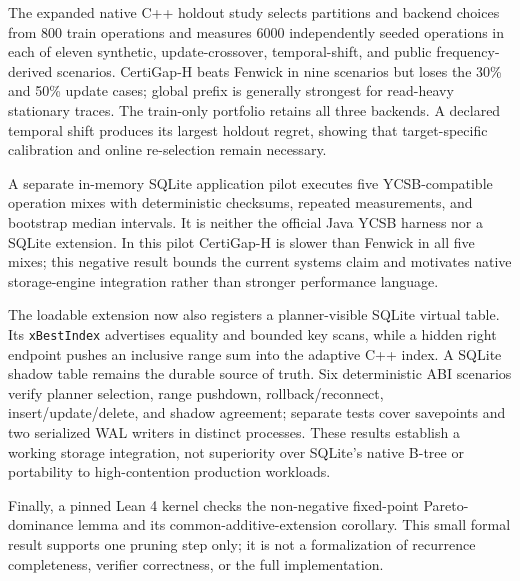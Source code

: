 \documentclass[10pt]{article}
\begin{document}
The expanded native C++ holdout study selects partitions and backend choices
from 800 train operations and measures 6000 independently seeded operations
in each of eleven synthetic, update-crossover, temporal-shift, and public
frequency-derived scenarios. CertiGap-H beats Fenwick in nine scenarios but
loses the 30\% and 50\% update cases; global prefix is generally strongest for
read-heavy stationary traces. The train-only portfolio retains all three
backends. A declared temporal shift produces its largest holdout regret,
showing that target-specific calibration and online re-selection remain
necessary.

A separate in-memory SQLite application pilot executes five YCSB-compatible
operation mixes with deterministic checksums, repeated measurements, and
bootstrap median intervals. It is neither the official Java YCSB harness nor a
SQLite extension. In this pilot CertiGap-H is slower than Fenwick in all five
mixes; this negative result bounds the current systems claim and motivates
native storage-engine integration rather than stronger performance language.

The loadable extension now also registers a planner-visible SQLite virtual
table. Its \texttt{xBestIndex} advertises equality and bounded key scans, while
a hidden right endpoint pushes an inclusive range sum into the adaptive C++
index. A SQLite shadow table remains the durable source of truth. Six
deterministic ABI scenarios verify planner selection, range pushdown,
rollback/reconnect, insert/update/delete, and shadow agreement; separate tests
cover savepoints and two serialized WAL writers in distinct processes. These
results establish a working storage integration, not superiority over SQLite's
native B-tree or portability to high-contention production workloads.

Finally, a pinned Lean 4 kernel checks the non-negative fixed-point
Pareto-dominance lemma and its common-additive-extension corollary. This small
formal result supports one pruning step only; it is not a formalization of
recurrence completeness, verifier correctness, or the full implementation.



\end{document}
